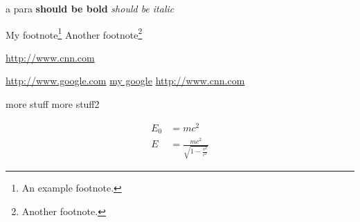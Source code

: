 \documentclass[10pt,a4paper]{article}
\begin{document}
  \begin{flushright}
  a para
  \textbf{should be bold}
  \textit{should be italic}

  \end{flushright}



  \begin{flushleft}
  My footnote\footnote{An example footnote.}
  Another footnote\footnote{Another footnote.}

  \hyperref[cnn]{http://www.cnn.com}

  \url{http://www.google.com}
  \href{http://www.google.com}{my google}
  \href{http://www.cnn.com}{http://www.cnn.com}

  \end{flushleft}
  more stuff
  more stuff2

  \begin{align}
    E_0 &= mc^2                              \\
    E &= \frac{mc^2}{\sqrt{1-\frac{v^2}{c^2}}}
  \end{align}
\end{document}
